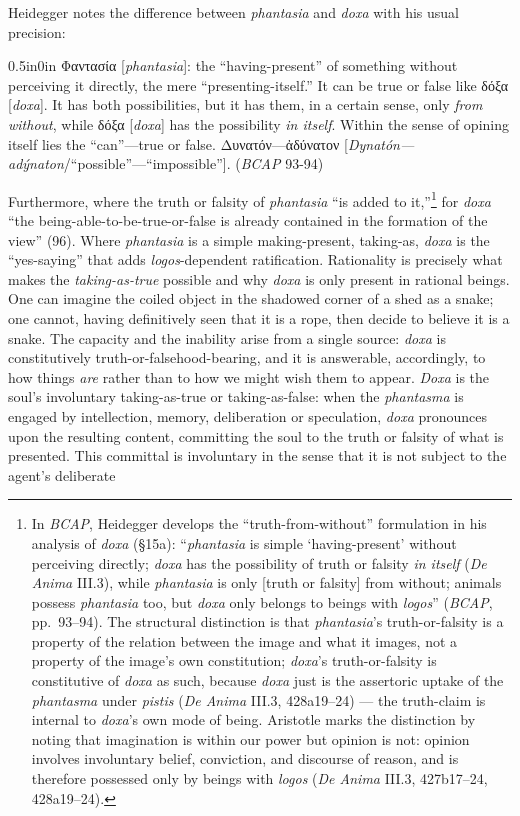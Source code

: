 \documentclass{article}
\newcommand{\gk}[1]{{\greekfont #1}}
\begin{document}
Heidegger notes the difference between \textit{phantasia} and \textit{doxa} with his usual precision: 
\begin{adjustwidth}{0.5in}{0in}
    \gk{Φαντασία} [\textit{phantasia}]: the ``having-present'' of something without perceiving it directly, the mere ``presenting-itself.'' It can be true or false like \gk{δόξα} [\textit{doxa}]. It has both possibilities, but it has them, in a certain sense, only \textit{from without}, while \gk{δόξα} [\textit{doxa}] has the possibility \textit{in itself}. Within the sense of opining itself lies the ``can''---true or false. \gk{Δυνατόν---ἀδύνατον} [\textit{Dynatón---adýnaton}/``possible''---``impossible'']. (\textit{BCAP} 93-94)
\end{adjustwidth}
Furthermore, where the truth or falsity of \textit{phantasia} ``is added to it,''\footnote{In \textit{BCAP}, Heidegger develops the ``truth-from-without'' formulation in his analysis of \textit{doxa} (§15a): ``\textit{phantasia} is simple `having-present' without perceiving directly; \textit{doxa} has the possibility of truth or falsity \textit{in itself} (\textit{De Anima} III.3), while \textit{phantasia} is only [truth or falsity] from without; animals possess \textit{phantasia} too, but \textit{doxa} only belongs to beings with \textit{logos}'' (\textit{BCAP}, pp.~93--94). The structural distinction is that \textit{phantasia}'s truth-or-falsity is a property of the relation between the image and what it images, not a property of the image's own constitution; \textit{doxa}'s truth-or-falsity is constitutive of \textit{doxa} as such, because \textit{doxa} just is the assertoric uptake of the \textit{phantasma} under \textit{pistis} (\textit{De Anima} III.3, 428a19--24) --- the truth-claim is internal to \textit{doxa}'s own mode of being. Aristotle marks the distinction by noting that imagination is within our power but opinion is not: opinion involves involuntary belief, conviction, and discourse of reason, and is therefore possessed only by beings with \textit{logos} (\textit{De Anima} III.3, 427b17--24, 428a19--24).} for \textit{doxa} ``the being-able-to-be-true-or-false is already contained in the formation of the view'' (96). Where \textit{phantasia} is a simple making-present, taking-as, \textit{doxa} is the ``yes-saying'' that adds \textit{logos}-dependent ratification. Rationality is precisely what makes the \textit{taking-as-true} possible and why \textit{doxa} is only present in rational beings. One can imagine the coiled object in the shadowed corner of a shed as a snake; one cannot, having definitively seen that it is a rope, then decide to believe it is a snake. The capacity and the inability arise from a single source: \textit{doxa} is constitutively truth-or-falsehood-bearing, and it is answerable, accordingly, to how things \textit{are} rather than to how we might wish them to appear. \textit{Doxa} is the soul's involuntary taking-as-true or taking-as-false: when the \textit{phantasma} is engaged by intellection, memory, deliberation or speculation, \textit{doxa} pronounces upon the resulting content, committing the soul to the truth or falsity of what is presented. This committal is involuntary in the sense that it is not subject to the agent's deliberate 
\end{document}
